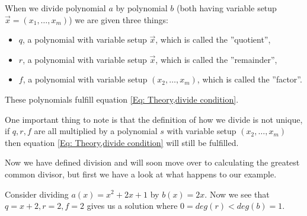 \begin{definition}
  When we divide polynomial $a$ by polynomial $b$ (both having variable setup $\vec{x}=(x_1,\ldots,x_m)$) we are given three things:
  \begin{itemize}
    \item $q$, a polynomial with variable setup $\vec{x}$, which is called the ''quotient'',
    \item $r$, a polynomial with variable setup $\vec{x}$, which is called the ''remainder'',
    \item $f$, a polynomial with variable setup $(x_2,\ldots,x_m)$, which is called the ''factor''.
  \end{itemize}
  These polynomials fulfill equation \ref{Eq: Theory,divide condition}.
\end{definition}
\begin{remark}
  One important thing to note is that the definition of how we divide is not unique, if $q,r,f$ are all multiplied by a polynomial $s$ with variable setup $(x_2,\ldots,x_m)$ then equation \ref{Eq: Theory,divide condition} will still be fulfilled.
\end{remark}

Now we have defined division and will soon move over to calculating the greatest common divisor, but first we have a look at what happens to our example.
\begin{example}
  Consider dividing $a(x)=x^2+2x+1$ by $b(x)=2x$. Now we see that $q=x+2,r=2,f=2$ gives us a solution where $0=deg(r)<deg(b)=1$.
\end{example}

